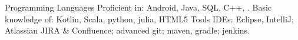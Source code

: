 \begin{cvskills}
  \cvskill
    {Programming Languages}
    {Proficient in: Android, Java, SQL, C++, \LaTeXe{}. 
       Basic knowledge of:
       Kotlin, Scala, python, julia, HTML5}
  \cvskill
  {Tools}
  {IDEs: Eclipse, IntelliJ;
   Atlassian JIRA \& Confluence;
   advanced git;
   maven, gradle;
   jenkins.
  }


\end{cvskills}
